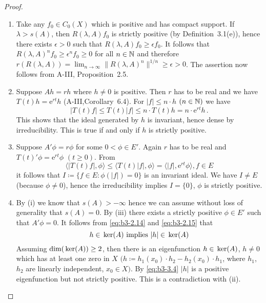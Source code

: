 \begin{proof} 
\begin{enumerate}[\upshape (i), wide, labelindent=.5em]
	\item 
	Take any $f_{0} \in C_{0}(X)$ which is positive and has compact support.
	If $\lambda > s(A)$, then $R(\lambda,A)f_{0}$ is strictly positive (by Definition~3.1(e)), hence there exists $\epsilon > 0$ such that $R(\lambda,A)f_{0} \geq \epsilon f_{0}$.
	It follows that $R(\lambda,A)^nf_{0} \geq \epsilon^nf_{0} \geq 0$ for all $n \in \mathbb{N}$ and therefore
	$r(R(\lambda,A)) = \lim_{n \to \infty}\|R(\lambda,A)^{n}\|^{1/n} \geq \epsilon > 0 $.
	The assertion now follows from A-III, Proposition~2.5.	

	\item 
	Suppose $Ah = rh$ where $h \neq 0$ is positive.
	Then $r$ has to be real and we have $T(t)h = \mathrm{e}^{rt}h$ (A-III,Corollary~6.4).
	For $|f| \leq n\cdot h$ $(n \in \mathbb{N})$ we have
	\begin{equation}\label{eq:b3-3.2}
		|T(t)f| \leq T(t)|f| \leq n\cdot T(t)h = n\cdot \mathrm{e}^{rt}h\,.		
	\end{equation}
		This shows that the ideal generated by $h$ is invariant, hence dense by irreducibility.
	This is true if and only if $h$ is strictly positive.
	
	\item 
	Suppose $A'\phi = r\phi$ for some $0 < \phi \in E'$.
	Again $r$ has to be real and $T(t)'\phi = \mathrm{e}^{rt}\phi$ $(t \geq 0)$.
	From
	\begin{equation}\label{eq:b3-3.3}
	\langle|T(t)f|,\phi\rangle \leq \langle T(t)|f|,\phi\rangle = \langle|f|,\mathrm{e}^{rt}\phi\rangle, f \in E			
	\end{equation}
	it follows that $I \coloneq \{f \in E : \phi(|f|) = 0\}$ is an invariant ideal.
	We have $I \neq E$ (because $\phi \neq 0$), hence the irreducibility implies $I = \{0\}$, \ie $\phi$ is strictly positive.
	
	\item 
	By (i) we know that $s(A) > -\infty$ hence we can assume without loss of generality that $s(A) = 0$.
	By (iii) there exists a strictly positive $\phi \in E'$ such that $A'\phi = 0$.
	It follows from \eqref{eq:b3-2.14} and \eqref{eq:b3-2.15} that
	\begin{equation}\label{eq:b3-3.4}
	h \in \mathop{}\mathrm{ker}(A) \text{ implies } |h| \in \mathop{}\mathrm{ker}(A)
	\end{equation}
	Assuming $\dim(\mathop{}\mathrm{ker}(A)) \geq 2$, then there is an eigenfunction $h \in \mathop{}\mathrm{ker}(A)$, $h \neq 0$ which has at least one zero in $X$ $(h \coloneq h_{1}(x_{0})\cdot h_{2} - h_{2}(x_{0})\cdot h_{1}$, where $h_{1}$, $h_{2}$ are linearly independent, $x_{0} \in X)$.
	By \eqref{eq:b3-3.4} $|h|$ is a positive eigenfunction but not strictly positive.
	This is a contradiction with (ii).
	

\end{enumerate}
\end{proof}
